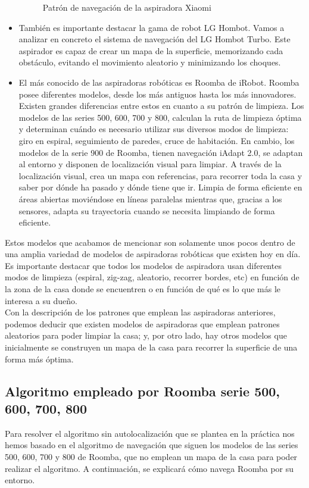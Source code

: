 \begin{itemize}
\begin{figure}[H]
\begin{center}
		\caption{Patrón de navegación de la aspiradora Xiaomi}
		\label{fig.Xiaomi}
		\end{center}
\end{figure}
\item También es importante destacar la gama de robot LG Hombot. Vamos a analizar en concreto el sistema de navegación del LG Hombot Turbo. Este aspirador es capaz de crear un mapa de la superficie, memorizando cada obstáculo, evitando el movimiento aleatorio y minimizando los choques. 
\item El más conocido de las aspiradoras robóticas es Roomba de iRobot. Roomba posee diferentes modelos, desde los más antiguos hasta los más innovadores. Existen grandes diferencias entre estos en cuanto a su patrón de limpieza. Los modelos de las series 500, 600, 700 y 800, calculan la ruta de limpieza óptima y determinan cuándo es necesario utilizar sus diversos modos de limpieza: giro en espiral, seguimiento de paredes, cruce de habitación. En cambio, los modelos de la serie 900 de Roomba, tienen navegación iAdapt 2.0, se adaptan al entorno y disponen de localización visual para limpiar. A través de la localización visual, crea un mapa con referencias, para recorrer toda la casa y saber por dónde ha pasado y dónde tiene que ir. Limpia de forma eficiente en áreas abiertas moviéndose en líneas paralelas mientras que, gracias a los sensores, adapta su trayectoria cuando se necesita limpiando de forma eficiente.
\end{itemize}

Estos modelos que acabamos de mencionar son solamente unos pocos dentro de una amplia variedad de modelos de aspiradoras robóticas que existen hoy en día.\\

Es importante destacar que todos los modelos de aspiradora usan diferentes modos de limpieza (espiral, zig-zag, aleatorio, recorrer bordes, etc) en función de la zona de la casa donde se encuentren o en función de qué es lo que más le interesa a su dueño.\\

Con la descripción de los patrones que emplean las aspiradoras anteriores, podemos deducir que existen modelos de aspiradoras que emplean patrones aleatorios para poder limpiar la casa; y, por otro lado, hay otros modelos que inicialmente se construyen un mapa de la casa para recorrer la superficie de una forma más óptima.

\subsection{Algoritmo empleado por Roomba serie 500, 600, 700, 800}
Para resolver el algoritmo sin autolocalización que se plantea en la práctica nos hemos basado en el algoritmo de navegación que siguen los modelos de las series 500, 600, 700 y 800 de Roomba, que no emplean un mapa de la casa para poder realizar el algoritmo. A continuación, se explicará cómo navega Roomba por su entorno.\\

